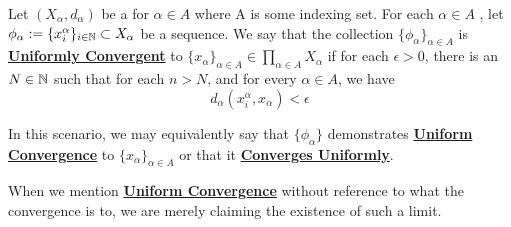 \label{def:uniformlyconvergent}
\newcommand{\UniformlyConvergent}[0]{\textbf{\hyperref[def:uniformlyconvergent]{Uniformly Convergent}}\xspace}
\newcommand{\ConvergesUniformly}[0]{\textbf{\hyperref[def:uniformlyconvergent]{Converges Uniformly}}\xspace}
\newcommand{\UniformConvergence}[0]{\textbf{\hyperref[def:uniformlyconvergent]{Uniform Convergence}}\xspace}

\begin{df}
	Let $(X_\alpha, d_\alpha)$ be a \PseudometricSpace
	for $\alpha \in A$ where A is some indexing set. 
	For each $\alpha \in A$
	, let $\phi_\alpha :=\{x_i^\alpha\}_{i \in \mathbb{N}} \subset X_{\alpha}$
	be a sequence. 
	We say that the collection $\{\phi_\alpha\}_{\alpha \in A}$ 
    is \UniformlyConvergent to 
    $\{x_\alpha\}_{\alpha \in A} \in \prod\limits_{\alpha \in A} X_\alpha$
    if for each $\epsilon > 0$, 
    there is an $N \in \mathbb{N}$
    such that for each $n>N$, 
    and for every $\alpha \in A$, 
    we have 
    \begin{equation}
        d_\alpha(x^{\alpha}_i,x_\alpha) < \epsilon
    \end{equation}

    In this scenario, we may equivalently say that
    $\{\phi_\alpha\}$ demonstrates \UniformConvergence
    to $\{x_\alpha\}_{\alpha \in A}$ 
    or that it \ConvergesUniformly. 

    When we mention \UniformConvergence without
    reference to what the convergence is to, 
    we are merely claiming the existence of 
    such a limit. 
\end{df}
